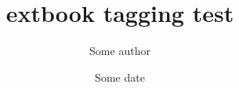 \documentclass{extbook}
\title{extbook tagging test}
\author{Some author}
\date{Some date}
\begin{document}
\maketitle
\tableofcontents
\blinddocument
\end{document}
